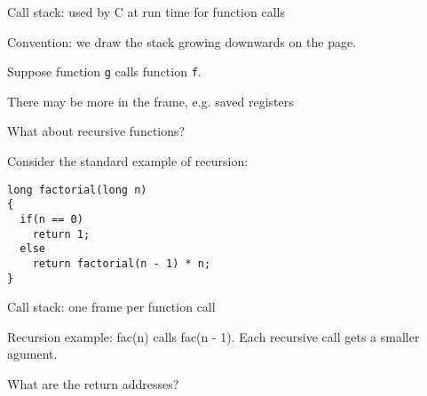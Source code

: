 \documentclass[landscape]{beamer}
\begin{document}
\begin{frame}[fragile]{Call stack: used by C at run time for function calls}


Convention: we draw the stack growing \alert{downwards} on the page. 

Suppose function \texttt g calls function \texttt f.


There may be more in the frame, e.g. saved registers  
\end{frame}   


\begin{frame}[fragile]{What about recursive functions?}

Consider the standard example of recursion:

\begin{verbatim}
long factorial(long n)
{
  if(n == 0)
    return 1;
  else
    return factorial(n - 1) * n;
}
\end{verbatim}


\end{frame}

\begin{frame}[fragile]{Call stack: one frame per function \alert{call}}


Recursion example: fac(n) calls fac(n - 1). Each recursive call gets a smaller agument.

What are the return addresses?
\\[1em]


\end{frame}   
\end{document}
